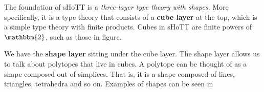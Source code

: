 \documentclass[main.tex]{subfiles}
\begin{document}
The foundation of sHoTT is a \textit{three-layer type theory with shapes}. More specifically, it is a type theory that consists 
of a \textbf{cube layer} at the top, which is a simple type theory with finite products. Cubes in sHoTT are finite powers of 
$\mathbbm{2}$, such as those in figure. 

We have the \textbf{shape layer} sitting under the cube layer. The shape layer allows us to talk about polytopes that live in cubes.
A polytope can be thought of as a shape composed out of simplices. That is, it is a shape composed of lines, triangles, tetrahedra
and so on. Examples of shapes can be seen in 
\end{document}
